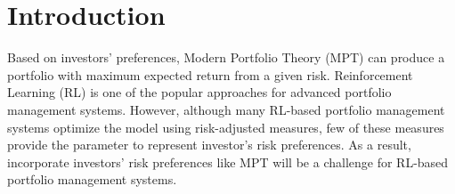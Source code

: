 \chapter{Introduction}

Based on investors' preferences, Modern Portfolio Theory (MPT) can produce a portfolio with maximum expected return from a given risk\cite{10.2307/2975974}. Reinforcement Learning (RL) is one of the popular approaches for advanced portfolio management systems. However, although many RL-based portfolio management systems optimize the model using risk-adjusted measures\cite{cogneau2009101}, few of these measures provide the parameter to represent investor's risk preferences. As a result, incorporate investors' risk preferences like MPT will be a challenge for RL-based portfolio management systems.  



% 
% 


\label{c:intro}

